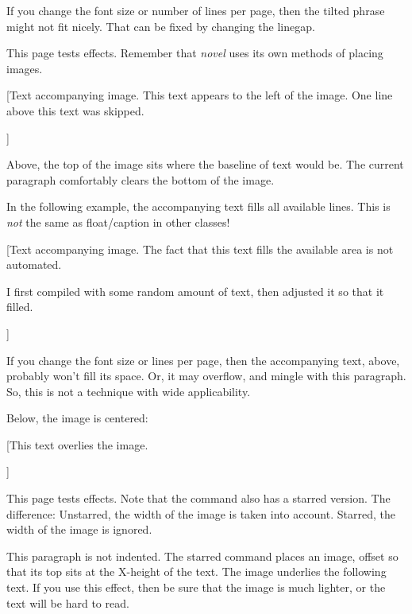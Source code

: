 \documentclass[test]{novel} %
\begin{document}
If you change the font size or number of lines per page, then the tilted phrase might not fit nicely. That can be fixed by changing the linegap.

\clearpage



This page tests \string\BlockImage\space effects. Remember that \textit{novel} uses its own methods of placing images.

[\pushtextdown{\nbs}Text accompanying image. This text appears to the left of the image. One line above this text was skipped.\par]

Above, the top of the image sits where the baseline of text would be. The current paragraph comfortably clears the bottom of the image.

\null

In the following example,  the accompanying text fills all available lines. This is \textit{not} the same as float/caption in other classes!

[Text accompanying image.  The fact that this text fills the available area is not automated.\par I first compiled with some random amount of text, then adjusted it so that it filled.\par]

If you change the font size or lines per page, then the accompanying text, above, probably won't fill its space. Or, it may overflow, and mingle with this paragraph. So, this is not a technique with wide applicability.

\null

Below, the image is centered:

[\pushtextdown{\nbs}This text overlies the image.\par]

\clearpage



This page tests \string\InlineImage\space effects. Note that the command also has a starred version. The difference: Unstarred, the width of the image is taken into account. Starred, the width of the image is ignored.

\null

\noindent{}This paragraph is not indented. The starred command places an image, offset so that its top sits at the X-height of the text. The image underlies the following text. If you use this effect, then be sure that the image is much lighter, or the text will be hard to read.
\end{document}
